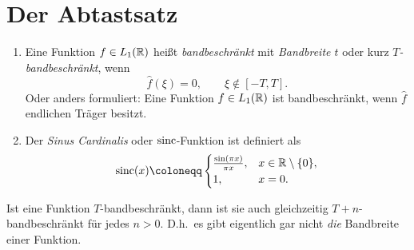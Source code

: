 \section{Der Abtastsatz}

\begin{definition}\leavevmode
\begin{enumerate}
\item Eine Funktion $ f \in L_{1}(\mathbb{R}) $ heißt \emph{bandbeschränkt} mit \emph{Bandbreite $ t $} oder
  kurz \emph{$ T $-bandbeschränkt}, wenn
  \[
    \widehat{f}(\xi) = 0, \qquad \xi \notin [-T,T].
  \]
  Oder anders formuliert: Eine Funktion $ f \in L_{1}(\mathbb{R}) $ ist bandbeschränkt, wenn $ \widehat{f} $
  endlichen Träger besitzt.
\item Der \emph{Sinus Cardinalis} oder $ \operatorname{sinc} $-Funktion ist definiert als
  \[
    \sinc(x) \coloneqq \begin{cases}
      \frac{\sin(\pi x)}{\pi x}, & x \in \R \setminus \{ 0 \}, \\
      1, & x = 0.
    \end{cases}
  \]
\end{enumerate}
\end{definition}

\begin{remark}[Bandbeschränktheit]
Ist eine Funktion $ T $-bandbeschränkt, dann ist sie auch gleichzeitig $ T + n $-bandbeschränkt für
jedes $ n > 0 $. D.h.\ es gibt eigentlich gar nicht \emph{die} Bandbreite einer Funktion.
\end{remark}

